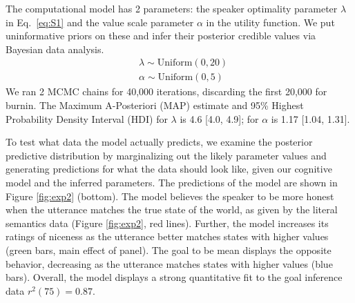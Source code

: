 \documentclass[10pt,letterpaper]{article}
\begin{document}
The computational model has 2 parameters: the speaker optimality parameter $\lambda$ in Eq.~\ref{eq:S1} and the value scale parameter $\alpha$ in the utility function. 
We put uninformative priors on these and infer their posterior credible values  via Bayesian data analysis.
\begin{eqnarray*}
& \lambda \sim \text{Uniform}(0,20)\\
& \alpha \sim \text{Uniform}(0, 5)
\end{eqnarray*}
We ran 2 MCMC chains for 40,000 iterations, discarding the first 20,000 for burnin.
The Maximum A-Posteriori (MAP) estimate and 95\% Highest Probability Density Interval (HDI) for $\lambda$ is 4.6 [4.0, 4.9]; for $\alpha$ is 1.17 [1.04, 1.31].%



To test what data the model actually predicts, we examine the posterior predictive distribution by marginalizing out the likely parameter values and generating predictions for what the data should look like, given our cognitive model and the inferred parameters.
The predictions of the model are shown in Figure \ref{fig:exp2} (bottom).
The model believes the speaker to be more honest when the utterance matches the true state of the world, as given by the literal semantics data (Figure \ref{fig:exp2}, red lines). 
Further, the model increases its ratings of niceness as the utterance better matches states with higher values (green bars, main effect of panel).
The goal to be mean displays the opposite behavior, decreasing as the utterance matches states with higher values (blue bars).
Overall, the model displays a strong quantitative fit to the goal inference data $r^2(75) = 0.87$.
\end{document}
